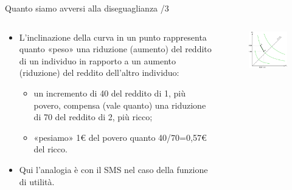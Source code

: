 \documentclass[aspectratio=64,12pt]{beamer}
\begin{document}
\begin{frame}{Quanto siamo avversi alla diseguaglianza /3}
\begin{columns}
\begin{column}{.5\columnwidth}
\begin{itemize}
\item L'inclinazione della curva in un punto rappresenta quanto «peso» una
riduzione (aumento) del reddito di un individuo in rapporto a un aumento
(riduzione) del reddito dell'altro individuo:
\begin{itemize}
\item un incremento di 40 del reddito di 1, più povero, compensa (vale quanto)
una riduzione di 70 del reddito di 2, più ricco;
\item «pesiamo» 1€ del povero quanto 40/70=0,57€ del ricco.
\end{itemize}
\item Qui l'analogia è con il SMS nel caso della funzione di utilità.
\end{itemize}
\end{column}

\begin{column}{.5\columnwidth}
\begin{figure}[htbp]
\centering
\includegraphics[width=\textwidth]{./figure/fbs-color-2.pdf}
\end{figure}
\end{column}
\end{columns}
\end{frame}
\end{document}
